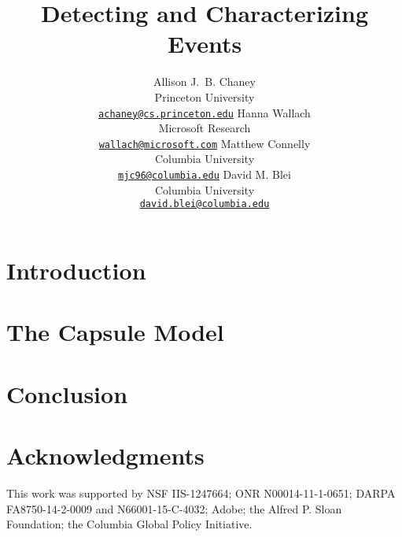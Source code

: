 \documentclass[11pt,letterpaper]{article}
\title{Detecting and Characterizing Events}
\author{
Allison J.~B. Chaney\\
    Princeton University\\
	\href{mailto:achaney@cs.princeton.edu}{\nolinkurl{achaney@cs.princeton.edu}}
\And
Hanna Wallach\\
    Microsoft Research\\
    \href{mailto:wallach@microsoft.com}{\nolinkurl{wallach@microsoft.com}}
\AND
Matthew Connelly\\
    Columbia University\\
    \href{mailto:mjc96@columbia.edu}{\nolinkurl{mjc96@columbia.edu}}
\And
David M. Blei\\
    Columbia University\\
    \href{mailto:david.blei@columbia.edu}{\nolinkurl{david.blei@columbia.edu}}
}
\date{}
\begin{document}
\maketitle

\begin{abstract}

\end{abstract}


\section{Introduction}
\label{sec:intro}


\section{The Capsule Model}
\label{sec:model}




\section{Conclusion}
\label{sec:discussion}



\section*{Acknowledgments}
This work was supported by NSF IIS-1247664; ONR N00014-11-1-0651;
DARPA FA8750-14-2-0009 and N66001-15-C-4032; Adobe; the Alfred
P. Sloan Foundation; the Columbia Global Policy Initiative.




\end{document}
